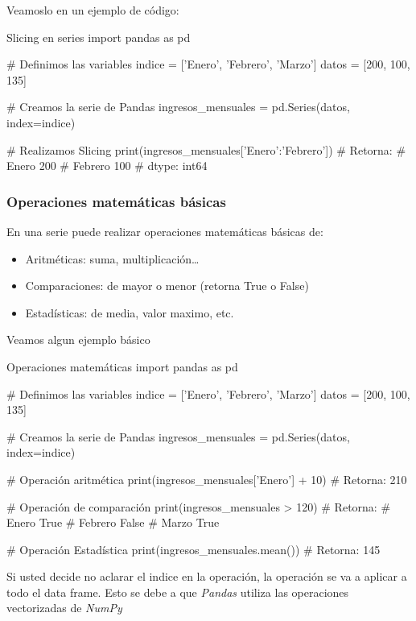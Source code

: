 Veamoslo en un ejemplo de código:
\begin{pycode}{Slicing en series}
import pandas as pd

# Definimos las variables
indice = ['Enero', 'Febrero', 'Marzo']
datos = [200, 100, 135]

# Creamos la serie de Pandas
ingresos_mensuales = pd.Series(datos, index=indice) 

# Realizamos Slicing
print(ingresos_mensuales['Enero':'Febrero']) # Retorna:
# Enero      200
# Febrero    100
# dtype: int64
\end{pycode}

\subsubsection{Operaciones matemáticas básicas}

En una serie puede realizar operaciones matemáticas básicas de:
\begin{itemize}
    \item Aritméticas: suma, multiplicación\dots
    \item Comparaciones: de mayor o menor (retorna True o False)
    \item Estadísticas: de media, valor maximo, etc.
\end{itemize}

Veamos algun ejemplo básico
\begin{pycode}{Operaciones matemáticas}
import pandas as pd

# Definimos las variables
indice = ['Enero', 'Febrero', 'Marzo']
datos = [200, 100, 135]

# Creamos la serie de Pandas
ingresos_mensuales = pd.Series(datos, index=indice) 

# Operación aritmética
print(ingresos_mensuales['Enero'] + 10) # Retorna: 210

# Operación de comparación
print(ingresos_mensuales > 120) # Retorna:
# Enero       True
# Febrero    False
# Marzo       True

# Operación Estadística
print(ingresos_mensuales.mean()) # Retorna: 145
\end{pycode}

\begin{nota}
    Si usted decide no aclarar el indice en la operación, la operación se va a aplicar a todo el data frame. Esto se debe a que \textit{Pandas} utiliza las operaciones vectorizadas de \textit{NumPy}
\end{nota}




